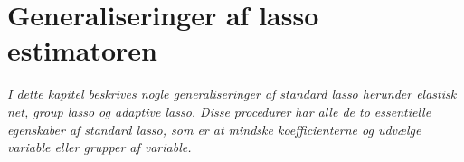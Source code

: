 \chapter{Generaliseringer af lasso estimatoren} \label{ch:generalisering_lasso}
\textit{I dette kapitel beskrives nogle generaliseringer af standard lasso herunder elastisk net, group lasso og adaptive lasso.
Disse procedurer har alle de to essentielle egenskaber af standard lasso, som er at mindske koefficienterne og udvælge variable eller grupper af variable.}


